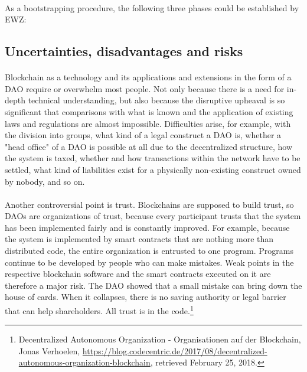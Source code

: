 \documentclass{scrartcl}
\begin{document}
	\paragraph{}
	As a bootstrapping procedure, the following three phases could be established by EWZ:
	
	\subsection{Uncertainties, disadvantages and risks}
	
	\paragraph{}
	Blockchain as a technology and its applications and extensions in the form of a DAO require or overwhelm most people.  Not only because there is a need for in-depth technical understanding, but also because the disruptive upheaval is so significant that comparisons with what is known and the application of existing laws and regulations are almost impossible. Difficulties arise, for example, with the division into groups, what kind of a legal construct a DAO is, whether a "head office" of a DAO is possible at all due to the decentralized structure, how the system is taxed, whether and how transactions within the network have to be settled, what kind of liabilities exist for a physically non-existing construct owned by nobody, and so on.
	
	\paragraph{}
	Another controversial point is trust. Blockchains are supposed to build trust, so DAOs are organizations of trust, because every participant trusts that the system has been implemented fairly and is constantly improved. For example, because the system is implemented by smart contracts that are nothing more than distributed code, the entire organization is entrusted to one program. Programs continue to be developed by people who can make mistakes. Weak points in the respective blockchain software and the smart contracts executed on it are therefore a major risk. The DAO showed that a small mistake can bring down the house of cards. When it collapses, there is no saving authority or legal barrier that can help shareholders. All trust is in the code.\footnote{Decentralized Autonomous Organization - Organisationen auf der Blockchain, Jonas Verhoelen, \url{https://blog.codecentric.de/2017/08/decentralized-autonomous-organization-blockchain}, retrieved February 25, 2018.}
    
\end{document}
